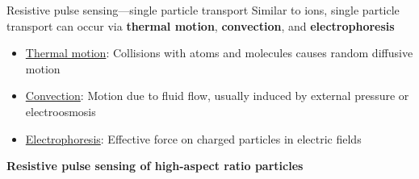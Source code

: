 \begin{frame}[c]{Resistive pulse sensing---single particle transport}
	Similar to ions, single particle transport can occur via \textbf{thermal motion}, \textbf{convection}, and \textbf{electrophoresis}
	\begin{itemize}
		\item \underline{Thermal motion}: Collisions with atoms and molecules causes random diffusive motion
		\item \underline{Convection}: Motion due to fluid flow, usually induced by external pressure or electroosmosis
		\item \underline{Electrophoresis}: Effective force on charged particles in electric fields
	\end{itemize}
	
	

\end{frame}





\begin{frame}[c]{}
	\begin{center}
		\textbf{Resistive pulse sensing of high-aspect ratio particles}
	\end{center}
\end{frame}







